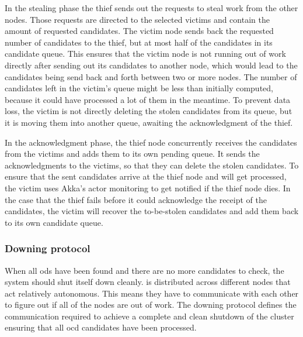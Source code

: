   In the stealing phase the thief sends out the requests to steal work from the other nodes.
  Those requests are directed to the selected victims and contain the amount of requested candidates.
  The victim node sends back the requested number of candidates to the thief, but at most half of the candidates in its candidate queue.
  This ensures that the victim node is not running out of work directly after sending out its candidates to another node, which would lead to the candidates being send back and forth between two or more nodes.
  The number of candidates left in the victim's queue might be less than initially computed, because it could have processed a lot of them in the meantime.
  To prevent data loss, the victim is not directly deleting the stolen candidates from its queue, but it is moving them into another queue, awaiting the acknowledgment of the thief.

  In the acknowledgment phase, the thief node concurrently receives the candidates from the victims and adds them to its own pending queue.
  It sends the acknowledgments to the victims, so that they can delete the stolen candidates.
  To ensure that the sent candidates arrive at the thief node and will get processed, the victim uses Akka's actor monitoring to get notified if the thief node dies.
  In the case that the thief fails before it could acknowledge the receipt of the candidates, the victim will recover the to-be-stolen candidates and add them back to its own candidate queue.

\subsubsection{Downing protocol}\label{protocol:downing}
  When all \glspl{od} have been found and there are no more candidates to check, the system should shut itself down cleanly.
  \dodo{} is distributed across different nodes that act relatively autonomous.
  This means they have to communicate with each other to figure out if all of the nodes are out of work.
  The downing protocol defines the communication required to achieve a complete and clean shutdown of the cluster ensuring that all \gls{ocd} candidates have been processed.

